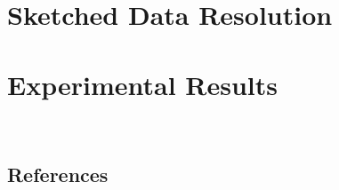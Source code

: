 \documentclass[10pt,a4paper]{article}
\begin{document}
\begin{multicols*}{2}
\section{Sketched Data Resolution}

\section{Experimental Results}

\ 

\begin{center}
\section*{References}
\end{center}

\end{multicols*}
\end{document}
